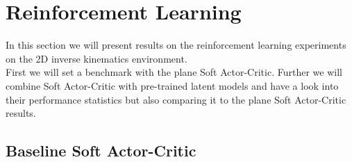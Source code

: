 \section{Reinforcement Learning}

In this section we will present results on the reinforcement learning experiments on the 2D inverse kinematics environment. \\
First we will set a benchmark with the plane Soft Actor-Critic. Further we will combine Soft Actor-Critic with pre-trained latent models and have a look into their performance statistics but also comparing it to the plane Soft Actor-Critic results. 

\subsection{Baseline Soft Actor-Critic}

